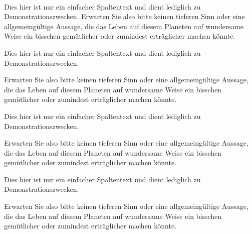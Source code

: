 \documentclass[a4paper,portrait]{scrreprt}
\begin{document}
\begin{multicols}{3}
\begin{tubsbox}[tuBlueLight20]{0}{1}{1}{1}
~
\end{tubsbox}
\begin{tubsbox}[tuBlueLight20]{1}{1}{1}{1}
~
\end{tubsbox}
\begin{tubsbox}[tuBlueLight20]{2}{1}{1}{1}
~
\end{tubsbox}
\begin{tubsbox}[tuBlueLight20]{3}{1}{1}{1}
~
\end{tubsbox}
\begin{tubsbox}[tuBlueLight20]{4}{1}{1}{1}
~
\end{tubsbox}
\begin{tubsbox}[tuBlueLight20]{5}{1}{1}{1}
~
\end{tubsbox}

 Dies hier ist nur ein einfacher Spaltentext und dient lediglich zu Demonstrationszwecken.
  Erwarten Sie also bitte keinen tieferen Sinn oder eine allgemeingültige Aussage, die das Leben auf diesem Planeten auf wundersame Weise ein bisschen gemütlicher oder zumindest erträglicher machen könnte.
  
   Dies hier ist nur ein einfacher Spaltentext und dient lediglich zu Demonstrationszwecken.
  
  Erwarten Sie also bitte keinen tieferen Sinn oder eine allgemeingültige Aussage, die das Leben auf diesem Planeten auf wundersame Weise ein bisschen gemütlicher oder zumindest erträglicher machen könnte.
  
   Dies hier ist nur ein einfacher Spaltentext und dient lediglich zu Demonstrationszwecken.
  
  Erwarten Sie also bitte keinen tieferen Sinn oder eine allgemeingültige Aussage, die das Leben auf diesem Planeten auf wundersame Weise ein bisschen gemütlicher oder zumindest erträglicher machen könnte.
  
   Dies hier ist nur ein einfacher Spaltentext und dient lediglich zu Demonstrationszwecken.
  
  Erwarten Sie also bitte keinen tieferen Sinn oder eine allgemeingültige Aussage, die das Leben auf diesem Planeten auf wundersame Weise ein bisschen gemütlicher oder zumindest erträglicher machen könnte.
  

\end{multicols}
\end{document}
